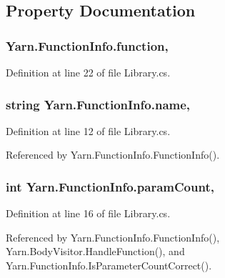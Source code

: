 \subsection{Property Documentation}
\hypertarget{a00100_a1dd2f9d11614a2fce170b3f3eecdb5f9}{
\subsubsection[{function}]{ Yarn.\-Function\-Info.\-function\hspace{0.3cm}{\ttfamily [get]}, {\ttfamily [set]}}}\label{a00100_a1dd2f9d11614a2fce170b3f3eecdb5f9}


Definition at line 22 of file Library.\-cs.

\hypertarget{a00100_adb38e83e3c1597b553aeff14bef5bfcb}{
\subsubsection[{name}]{\setlength{\rightskip}{0pt plus 5cm}string Yarn.\-Function\-Info.\-name\hspace{0.3cm}{\ttfamily [get]}, {\ttfamily [set]}}}\label{a00100_adb38e83e3c1597b553aeff14bef5bfcb}


Definition at line 12 of file Library.\-cs.



Referenced by Yarn.\-Function\-Info.\-Function\-Info().

\hypertarget{a00100_aa8527de9e4f153b05164ccaf167c3186}{
\subsubsection[{param\-Count}]{\setlength{\rightskip}{0pt plus 5cm}int Yarn.\-Function\-Info.\-param\-Count\hspace{0.3cm}{\ttfamily [get]}, {\ttfamily [set]}}}\label{a00100_aa8527de9e4f153b05164ccaf167c3186}


Definition at line 16 of file Library.\-cs.



Referenced by Yarn.\-Function\-Info.\-Function\-Info(), Yarn.\-Body\-Visitor.\-Handle\-Function(), and Yarn.\-Function\-Info.\-Is\-Parameter\-Count\-Correct().

